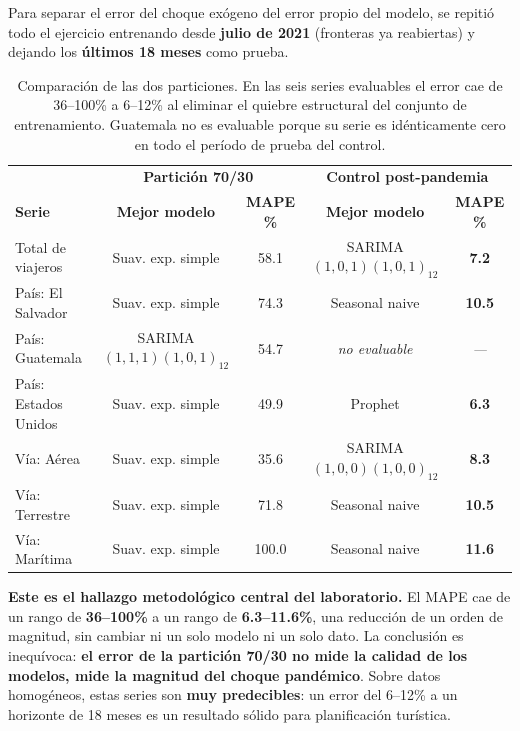 \documentclass[12pt,letterpaper]{article}
\begin{document}
Para separar el error del choque exógeno del error propio del modelo, se repitió todo el
ejercicio entrenando desde \textbf{julio de 2021} (fronteras ya reabiertas) y dejando los
\textbf{últimos 18 meses} como prueba.

\begin{table}[H]
\centering
\small
\begin{tabular}{lcc|cc}
\toprule
& \multicolumn{2}{c|}{\textbf{Partición 70/30}} & \multicolumn{2}{c}{\textbf{Control post-pandemia}} \\
\textbf{Serie} & \textbf{Mejor modelo} & \textbf{MAPE \%} & \textbf{Mejor modelo} & \textbf{MAPE \%} \\
\midrule
Total de viajeros      & Suav. exp. simple & 58.1 & SARIMA$(1,0,1)(1,0,1)_{12}$ & \textbf{7.2} \\
País: El Salvador      & Suav. exp. simple & 74.3 & Seasonal naive              & \textbf{10.5} \\
País: Guatemala        & SARIMA$(1,1,1)(1,0,1)_{12}$ & 54.7 & \textit{no evaluable} & \textit{---} \\
País: Estados Unidos   & Suav. exp. simple & 49.9 & Prophet                     & \textbf{6.3} \\
Vía: Aérea             & Suav. exp. simple & 35.6 & SARIMA$(1,0,0)(1,0,0)_{12}$ & \textbf{8.3} \\
Vía: Terrestre         & Suav. exp. simple & 71.8 & Seasonal naive              & \textbf{10.5} \\
Vía: Marítima          & Suav. exp. simple & 100.0 & Seasonal naive             & \textbf{11.6} \\
\bottomrule
\end{tabular}
\caption{Comparación de las dos particiones. En las seis series evaluables el error cae de
36--100\% a 6--12\% al eliminar el quiebre estructural del conjunto de entrenamiento. Guatemala
no es evaluable porque su serie es idénticamente cero en todo el período de prueba del control.}
\end{table}

\textbf{Este es el hallazgo metodológico central del laboratorio.} El MAPE cae de un rango de
\textbf{36--100\%} a un rango de \textbf{6.3--11.6\%}, una reducción de un orden de magnitud,
sin cambiar ni un solo modelo ni un solo dato. La conclusión es inequívoca: \textbf{el error de
la partición 70/30 no mide la calidad de los modelos, mide la magnitud del choque pandémico}.
Sobre datos homogéneos, estas series son \textbf{muy predecibles}: un error del 6--12\% a un
horizonte de 18 meses es un resultado sólido para planificación turística.
\end{document}
